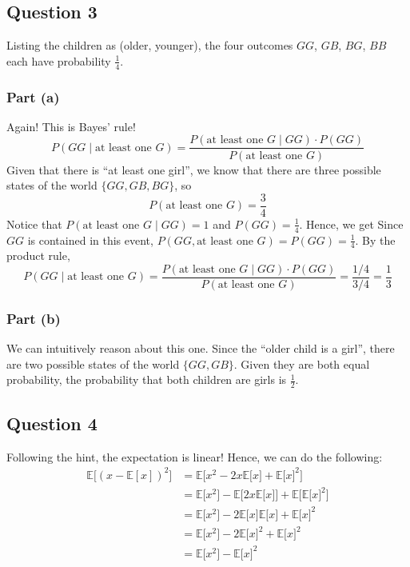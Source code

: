 \documentclass[11pt]{article}
\newcommand{\E}{\mathbb{E}}
\begin{document}
\subsection*{Question 3}
Listing the children as (older, younger), the four outcomes $GG$, $GB$, $BG$, $BB$ each have probability $\tfrac{1}{4}$.

\subsubsection*{Part (a)}
Again! This is Bayes' rule!
\[
P(GG\mid \text{at least one } G)=\frac{P(\text{at least one } G\mid GG)\cdot P(GG)}{P(\text{at least one } G)}
\]
Given that there is ``at least one girl'', we know that there are three possible states of the world $\{GG,GB,BG\}$, so 
\[
P(\text{at least one } G)=\frac{3}{4}
\]
Notice that $P(\text{at least one } G\mid GG)=1$ and $P(GG)=\frac{1}{4}$. Hence, we get
Since $GG$ is contained in this event, $P(GG,\text{at least one } G)=P(GG)=\tfrac{1}{4}$. By the product rule,
\[
P(GG\mid \text{at least one } G)=\frac{P(\text{at least one } G\mid GG)\cdot P(GG)}{P(\text{at least one } G)}=\frac{1/4}{3/4}=\frac{1}{3}
\]

\subsubsection*{Part (b)}
We can intuitively reason about this one. Since the ``older child is a girl'', there are two possible states of the world $\{GG,GB\}$. Given they are both equal probability, the probability that both children are girls is $\frac{1}{2}$.

\subsection*{Question 4}
Following the hint, the expectation is linear! Hence, we can do the following:
\begin{align*}
    \E\big[(x-\E[x])^2\big] &= \E\big[ x^2 -2x\E\big[x\big] + \E\big[x\big]^2 \big]\\
    &=\E\big[x^2\big] - \E\big[2x\E\big[x\big]\big] + \E\big[\E \big[ x \big]^2\big]\\
    &= \E\big[x^2\big] - 2 \E\big[x\big]\E\big[x\big] + \E\big[x\big]^2\\
    &= \E\big[x^2\big] - 2 \E\big[x\big]^2 + \E\big[x\big]^2\\
    &= \E\big[x^2\big] - \E\big[x\big]^2
\end{align*}
\end{document}
